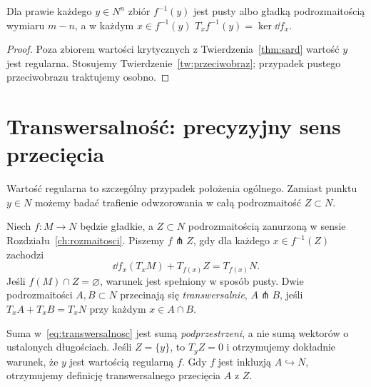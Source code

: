 \begin{wniosek}
\label{cor:sard-poziomica}
Dla prawie każdego $y\in N^n$ zbiór
$f^{-1}(y)$ jest pusty albo gładką
podrozmaitością wymiaru $m-n$, a w każdym
$x\in f^{-1}(y)$
$T_xf^{-1}(y)=\ker\dd f_x$.
\end{wniosek}
\begin{proof}
Poza zbiorem wartości krytycznych z
Twierdzenia~\ref{thm:sard} wartość $y$
jest regularna. Stosujemy
Twierdzenie~\ref{tw:przeciwobraz}; przypadek
pustego przeciwobrazu traktujemy osobno.
\end{proof}

\section{Transwersalność: precyzyjny sens przecięcia}
\label{sec:transwersalnosc}

Wartość regularna to szczególny przypadek
położenia ogólnego. Zamiast punktu $y\in N$
możemy badać trafienie odwzorowania w całą
podrozmaitość $Z\subset N$.

\begin{definicja}
\label{def:transwersalnosc}
Niech $f:M\to N$ będzie gładkie, a
$Z\subset N$ podrozmaitością zanurzoną w sensie
Rozdziału~\ref{ch:rozmaitosci}. Piszemy
$f\pitchfork Z$, gdy dla każdego
$x\in f^{-1}(Z)$ zachodzi
\begin{equation}\label{eq:transwersalnosc}
 \dd f_x(T_xM)+T_{f(x)}Z=T_{f(x)}N.
\end{equation}
Jeśli $f(M)\cap Z=\varnothing$, warunek jest spełniony
w sposób pusty. Dwie podrozmaitości $A,B\subset N$
przecinają się \emph{transwersalnie},
$A\pitchfork B$, jeśli
$T_xA+T_xB=T_xN$ przy każdym $x\in A\cap B$.
\end{definicja}

Suma w~\eqref{eq:transwersalnosc} jest sumą
\emph{podprzestrzeni}, a nie sumą wektorów
o ustalonych długościach. Jeśli $Z=\{y\}$,
to $T_yZ=0$ i otrzymujemy dokładnie warunek,
że $y$ jest wartością regularną $f$.
Gdy $f$ jest inkluzją $A\hookrightarrow N$,
otrzymujemy definicję transwersalnego
przecięcia $A$ z $Z$.

